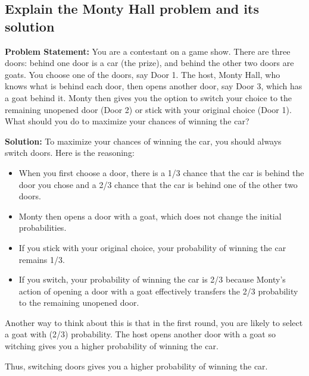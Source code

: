 \documentclass[12pt]{article}
\begin{document}
\subsection{Explain the Monty Hall problem and its solution}
\textbf{Problem Statement:}
You are a contestant on a game show. There are three doors: behind one door is a car (the prize), and behind the other two doors are goats. You choose one of the doors, say Door 1. The host, Monty Hall, who knows what is behind each door, then opens another door, say Door 3, which has a goat behind it. Monty then gives you the option to switch your choice to the remaining unopened door (Door 2) or stick with your original choice (Door 1). What should you do to maximize your chances of winning the car?

\textbf{Solution:}
To maximize your chances of winning the car, you should always switch doors. Here is the reasoning:

\begin{itemize}
    \item When you first choose a door, there is a 1/3 chance that the car is behind the door you chose and a 2/3 chance that the car is behind one of the other two doors.
    \item Monty then opens a door with a goat, which does not change the initial probabilities.
    \item If you stick with your original choice, your probability of winning the car remains 1/3.
    \item If you switch, your probability of winning the car is 2/3 because Monty's action of opening a door with a goat effectively transfers the 2/3 probability to the remaining unopened door.
\end{itemize}

Another way to think about this is that in the first round, you are likely to select a goat with (2/3) probability. The host opens another door with a goat so witching gives you a higher probability of winning the car.

Thus, switching doors gives you a higher probability of winning the car.
\end{document}
